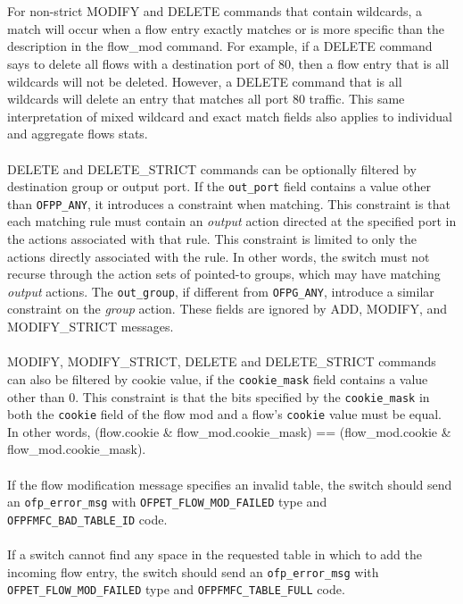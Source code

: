 \documentclass[10pt]{article}
\begin{document}
\\\\
For non-strict MODIFY and DELETE commands that contain wildcards, a match will occur when a flow entry exactly matches or is more specific than the description in the flow\_mod command. For example, if a DELETE command says to delete all flows with a destination port of 80, then a flow entry that is all wildcards will not be deleted. However, a DELETE command that is all wildcards will delete an entry that matches all port 80 traffic.  This same interpretation of mixed wildcard and exact match fields also applies to individual and aggregate flows stats.
\\\\
DELETE and DELETE\_STRICT commands can be optionally filtered by destination group or output port.  If the \verb|out_port| field contains a value other than \verb|OFPP_ANY|, it introduces a constraint when matching.  This constraint is that each matching rule must contain an \emph{output} action directed at the specified port in the actions associated with that rule.  This constraint is limited to only the actions directly associated with the rule.  In other words, the switch must not recurse through the action sets of pointed-to groups, which may have matching \emph{output} actions.  The \verb|out_group|, if different from \verb|OFPG_ANY|, introduce a similar constraint on the \emph{group} action. These fields are ignored by ADD, MODIFY, and MODIFY\_STRICT messages.
\\\\
MODIFY, MODIFY\_STRICT, DELETE and DELETE\_STRICT commands can also be filtered by cookie value, if the \verb|cookie_mask| field contains a value other than 0. This constraint is that the bits specified by the \verb|cookie_mask| in both the \verb|cookie| field of the flow mod and a flow's \verb|cookie| value must be equal. In other words, (flow.cookie \& flow\_mod.cookie\_mask) == (flow\_mod.cookie \& flow\_mod.cookie\_mask).
\\\\
If the flow modification message specifies an invalid table, the switch should send an \verb|ofp_error_msg| with \verb|OFPET_FLOW_MOD_FAILED| type and \verb|OFPFMFC_BAD_TABLE_ID| code.
\\\\
If a switch cannot find any space in the requested table in which to add the incoming flow entry, the switch should send an \verb|ofp_error_msg| with \verb|OFPET_FLOW_MOD_FAILED| type and \verb|OFPFMFC_TABLE_FULL| code.
\\\\
\end{document}

